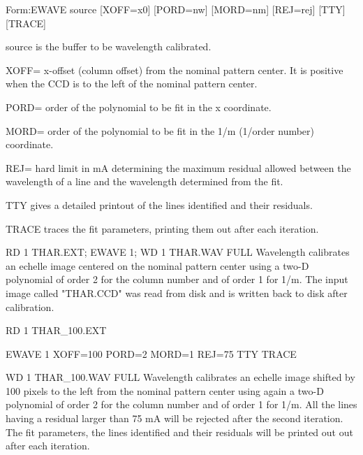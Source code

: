 {\newpage\clearpage
{}%
\begin{command}
  \item[Form:EWAVE source {[XOFF=x0]} {[PORD=nw]} {[MORD=nm]} {[REJ=rej]} 
       {[TTY]} {[TRACE]} \hfill]{}
  \item[source]{is the buffer to be wavelength calibrated.}
  \item[XOFF=]{x-offset (column offset) from the nominal 
       pattern center. It is positive when the CCD
       is to the left of the nominal pattern center.}
  \item[PORD=]{order of the polynomial to be fit in the x coordinate.}
  \item[MORD=]{order of the polynomial to be fit in the 1/m
       (1/order number) coordinate.}
  \item[REJ=]{hard limit in mA determining the maximum residual
       allowed between the wavelength of a line and the
       wavelength determined from the fit.}
  \item[TTY]{gives a detailed printout of the lines identified and 
       their residuals.}
  \item[TRACE]{traces the fit parameters, printing them out after each 
       iteration.}
\end{command}%
\lthtmlfigureZ
\lthtmlcheckvsize\clearpage}

{\newpage\clearpage
{}%
\begin{example}
  \item[RD 1 THAR.EXT; EWAVE 1; WD 1 THAR.WAV FULL\hfill]{ Wavelength
       calibrates an echelle image centered on the nominal pattern center
       using a two-D polynomial of order 2 for the column number and of
       order 1 for 1/m.  The input image called "THAR.CCD" was read from
       disk and is written back to disk after calibration.}
\par
\item[RD 1 THAR\_100.EXT\hfill]{}
\par
\item[EWAVE 1 XOFF=100 PORD=2 MORD=1 REJ=75 TTY TRACE\hfill]{}
\par
\item[WD 1 THAR\_100.WAV FULL\hfill]{ Wavelength calibrates an echelle
       image shifted by 100 pixels to the left from the nominal pattern
       center using again a two-D polynomial of order 2 for the column
       number and of order 1 for 1/m.  All the lines having a residual
       larger than 75 mA will be rejected after the second iteration.  The
       fit parameters, the lines identified and their residuals will be
       printed out out after each iteration.}
\end{example}%
\lthtmlfigureZ
\lthtmlcheckvsize\clearpage}

